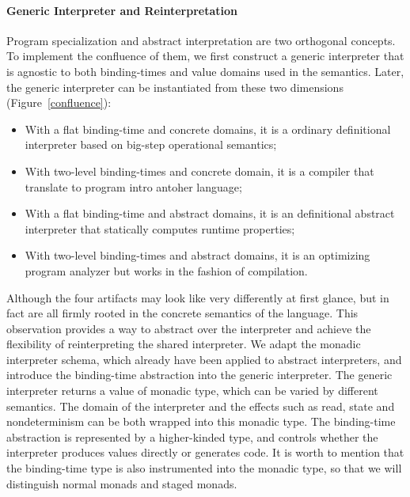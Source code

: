 

\paragraph{Generic Interpreter and Reinterpretation}

Program specialization and abstract interpretation are two orthogonal concepts.
To implement the confluence of them, we first construct a generic interpreter that
is agnostic to both binding-times and value domains used in the semantics.
Later, the generic interpreter can be instantiated from these two dimensions (Figure~\ref{confluence}):
\begin{itemize}
\item With a flat binding-time and concrete domains, it is a ordinary definitional interpreter based
  on big-step operational semantics;
\item With two-level binding-times and concrete domain, it is a compiler that translate to program
  intro antoher language;
\item With a flat binding-time and abstract domains, it is an definitional abstract interpreter
  \cite{DBLP:journals/pacmpl/DaraisLNH17} that statically computes runtime properties;
\item With two-level binding-times and abstract domains, it is an optimizing program analyzer but
  works in the fashion of compilation.
\end{itemize}

Although the four artifacts may look like very differently at first glance,
but in fact are all firmly rooted in the concrete semantics of the language.
This observation provides a way to abstract over the interpreter and achieve
the flexibility of reinterpreting the shared interpreter. We adapt the monadic
interpreter schema, which already have been applied to abstract interpreters,
and introduce the binding-time abstraction into the generic interpreter.
The generic interpreter returns a value of monadic type, which can be varied
by different semantics. The domain of the interpreter and the effects such as read,
state and nondeterminism can be both wrapped into this monadic type.
The binding-time abstraction is represented by a higher-kinded type,
and controls whether the interpreter produces values directly or generates code.
It is worth to mention that the binding-time type is also instrumented into
the monadic type, so that we will distinguish normal monads and staged monads.

